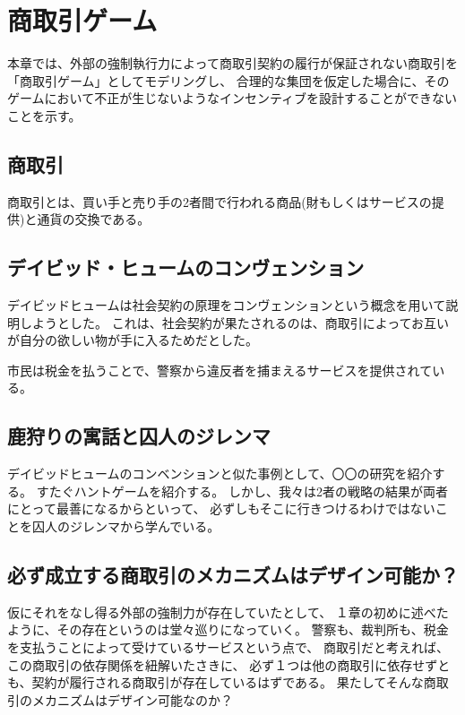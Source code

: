 \chapter{商取引ゲーム}
本章では、外部の強制執行力によって商取引契約の履行が保証されない商取引を「商取引ゲーム」としてモデリングし、
合理的な集団を仮定した場合に、そのゲームにおいて不正が生じないようなインセンティブを設計することができないことを示す。

\section{商取引}
商取引とは、買い手と売り手の2者間で行われる商品(財もしくはサービスの提供)と通貨の交換である。


\section{デイビッド・ヒュームのコンヴェンション}
デイビッドヒュームは社会契約の原理をコンヴェンションという概念を用いて説明しようとした。
これは、社会契約が果たされるのは、商取引によってお互いが自分の欲しい物が手に入るためだとした。

市民は税金を払うことで、警察から違反者を捕まえるサービスを提供されている。

\section{鹿狩りの寓話と囚人のジレンマ}
デイビッドヒュームのコンベンションと似た事例として、〇〇の研究を紹介する。
すたぐハントゲームを紹介する。
しかし、我々は2者の戦略の結果が両者にとって最善になるからといって、
必ずしもそこに行きつけるわけではないことを囚人のジレンマから学んでいる。

\section{必ず成立する商取引のメカニズムはデザイン可能か？}
仮にそれをなし得る外部の強制力が存在していたとして、
１章の初めに述べたように、その存在というのは堂々巡りになっていく。
警察も、裁判所も、税金を支払うことによって受けているサービスという点で、
商取引だと考えれば、この商取引の依存関係を紐解いたさきに、
必ず１つは他の商取引に依存せずとも、契約が履行される商取引が存在しているはずである。
果たしてそんな商取引のメカニズムはデザイン可能なのか？

